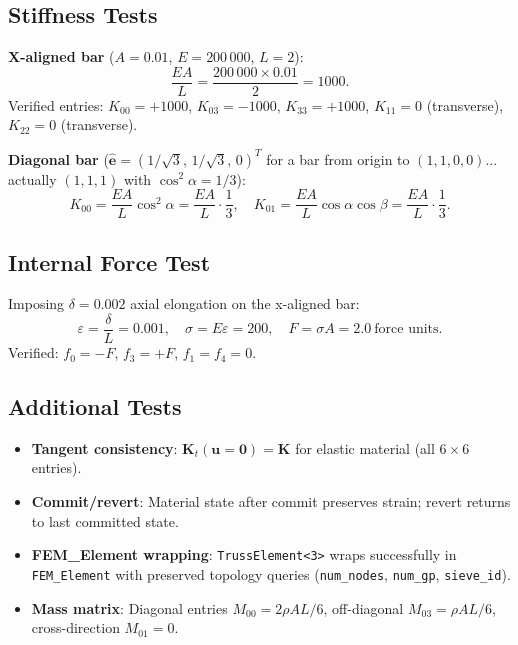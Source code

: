 \subsection{Stiffness Tests}
\label{sec:truss-stiffness-tests}

\textbf{X-aligned bar} ($A=0.01$, $E=200\,000$, $L=2$):
\begin{equation}
    \frac{EA}{L} = \frac{200\,000 \times 0.01}{2} = 1000.
    \label{eq:truss-test-EA-L}
\end{equation}
Verified entries:
$K_{00} = +1000$,
$K_{03} = -1000$,
$K_{33} = +1000$,
$K_{11} = 0$ (transverse),
$K_{22} = 0$ (transverse).

\textbf{Diagonal bar} ($\hat{\mathbf{e}} = (1/\sqrt{3},\, 1/\sqrt{3},\, 0)^T$
for a bar from origin to $(1,1,0,0)$... actually $(1,1,1)$ with
$\cos^2\alpha = 1/3$):
\begin{equation}
    K_{00} = \frac{EA}{L}\cos^2\alpha = \frac{EA}{L}\cdot\frac{1}{3}, \quad
    K_{01} = \frac{EA}{L}\cos\alpha\cos\beta = \frac{EA}{L}\cdot\frac{1}{3}.
    \label{eq:truss-test-diagonal}
\end{equation}

\subsection{Internal Force Test}
\label{sec:truss-force-test}

Imposing $\delta = 0.002$ axial elongation on the x-aligned bar:
\begin{equation}
    \varepsilon = \frac{\delta}{L} = 0.001, \quad
    \sigma = E\varepsilon = 200, \quad
    F = \sigma A = 2.0~\text{force units}.
\end{equation}
Verified: $f_0 = -F$, $f_3 = +F$, $f_1 = f_4 = 0$.

\subsection{Additional Tests}

\begin{itemize}
    \item \textbf{Tangent consistency}: $\mathbf{K}_t(\mathbf{u}=\mathbf{0})
          = \mathbf{K}$ for elastic material (all $6 \times 6$ entries).
    \item \textbf{Commit/revert}: Material state after commit preserves
          strain; revert returns to last committed state.
    \item \textbf{FEM\_Element wrapping}: \texttt{TrussElement<3>} wraps
          successfully in \texttt{FEM\_Element} with preserved topology
          queries (\texttt{num\_nodes}, \texttt{num\_gp}, \texttt{sieve\_id}).
    \item \textbf{Mass matrix}: Diagonal entries $M_{00} = 2\rho AL/6$,
          off-diagonal $M_{03} = \rho AL/6$, cross-direction $M_{01} = 0$.
\end{itemize}

